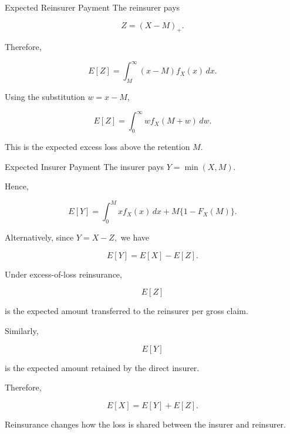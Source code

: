 \documentclass[
  ignorenonframetext,
  aspectratio=169,
]{beamer}
\begin{document}
\begin{frame}{Expected Reinsurer Payment}
\protect{}\label{expected-reinsurer-payment}
The reinsurer pays

\[
Z=(X-M)_+.
\]

Therefore,

\[
\boxed{
E[Z]
=
\int_M^\infty
(x-M)f_X(x)\,dx.
}
\]

Using the substitution \(w=x-M\),

\[
\boxed{
E[Z]
=
\int_0^\infty
w f_X(M+w)\,dw.
}
\]

This is the expected excess loss above the retention \(M\).
\end{frame}

\begin{frame}{Expected Insurer Payment}
\protect{}\label{expected-insurer-payment-1}
The insurer pays \(Y=\min(X,M).\)

Hence,

\[
\boxed{
E[Y]
=
\int_0^M x f_X(x)\,dx
+
M\{1-F_X(M)\}.
}
\]

Alternatively, since \(Y=X-Z,\) we have

\[
\boxed{
E[Y]=E[X]-E[Z].
}
\]
\end{frame}

\begin{frame}
\begin{tcolorbox}[enhanced jigsaw, arc=.35mm, bottomrule=.15mm, bottomtitle=1mm, breakable, colback=white, colbacktitle=quarto-callout-note-color!10!white, colframe=quarto-callout-note-color-frame, coltitle=black, left=2mm, leftrule=.75mm, opacityback=0, opacitybacktitle=0.6, rightrule=.15mm, title=\textcolor{quarto-callout-note-color}{\faInfo}\hspace{0.5em}{Interpretation of the expected payments}, titlerule=0mm, toprule=.15mm, toptitle=1mm]

Under excess-of-loss reinsurance,

\[
E[Z]
\]

is the expected amount transferred to the reinsurer per gross claim.

Similarly,

\[
E[Y]
\]

is the expected amount retained by the direct insurer.

Therefore,

\[
\boxed{
E[X]=E[Y]+E[Z].
}
\]

Reinsurance changes how the loss is shared between the insurer and
reinsurer.

\end{tcolorbox}
\end{frame}
\end{document}
